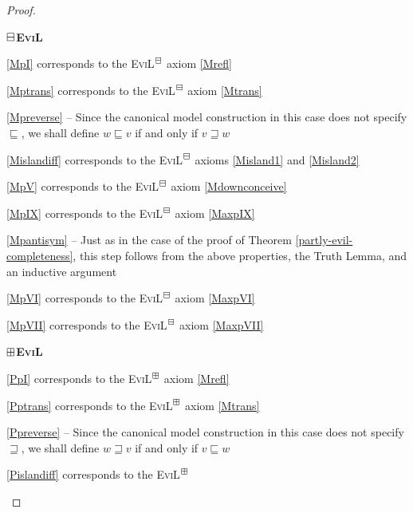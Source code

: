 \begin{proof}
\begin{minipage}[b]{0.5\linewidth}
\begin{center}
\textbf{$\boxminus$\textsc{EviL}}
\end{center}
  \begin{empt}
    \item \ref{MpI} corresponds to the \textsc{EviL}$^\boxminus$ axiom \eqref{Mrefl}
    \item \ref{Mptrans} corresponds to the \textsc{EviL}$^\boxminus$ axiom \eqref{Mtrans}
    \item \ref{Mpreverse} -- Since the canonical model construction in
      this case does not specify $\sqsubseteq$, we shall define 
     $w \sqsubseteq  v$ if and only if $v \sqsupseteq w$
   \item \ref{Mislandiff} corresponds to the \textsc{EviL}$^\boxminus$
     axioms \eqref{Misland1} and \eqref{Misland2}
    \item \ref{MpV} corresponds to the \textsc{EviL}$^\boxminus$
     axiom \eqref{Mdownconceive}
    \item \ref{MpIX} corresponds to the \textsc{EviL}$^\boxminus$
     axiom \eqref{MaxpIX}
    \item \ref{Mpantisym} -- 
     Just as in the case of the proof of Theorem 
    \ref{partly-evil-completeness}, this step follows from the above
  properties, the Truth Lemma, and an inductive argument
     \item \ref{MpVI} corresponds to the \textsc{EviL}$^\boxminus$
     axiom \eqref{MaxpVI}
     \item \ref{MpVII} corresponds to the \textsc{EviL}$^\boxminus$
     axiom \eqref{MaxpVII}
  \end{empt}
\end{minipage}
\hspace{0.5cm}
\begin{minipage}[b]{0.5\linewidth}
\begin{center}
\textbf{$\boxplus$\textsc{EviL}}
\end{center}
  \begin{empt}
    \item \ref{PpI} corresponds to the \textsc{EviL}$^\boxplus$ axiom \eqref{Mrefl}
    \item \ref{Pptrans} corresponds to the \textsc{EviL}$^\boxplus$ axiom \eqref{Mtrans}
    \item \ref{Ppreverse} -- Since the canonical model construction in
      this case does not specify $\sqsupseteq$, we shall define 
     $w \sqsupseteq  v$ if and only if $v \sqsubseteq w$
   \item \ref{Pislandiff} corresponds to the \textsc{EviL}$^\boxplus$

\end{empt}
\end{minipage}
\end{proof}
